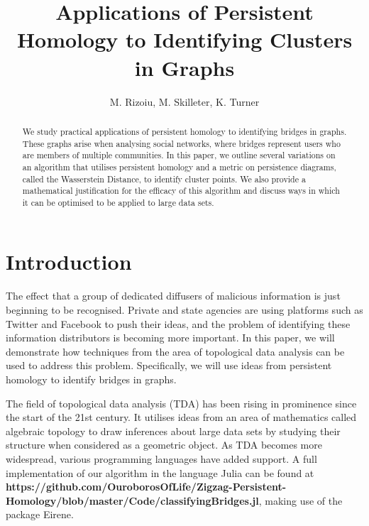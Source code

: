 \documentclass[12pt,a4paper]{amsart}
\numberwithin{equation}{section}
\theoremstyle{plain}
\theoremstyle{definition}
\begin{document}
\title{Applications of Persistent Homology to Identifying Clusters in Graphs }


\author[]{M. Rizoiu, M. Skilleter, K. Turner}

\address{Australian National University \\ Mathematical Sciences Institute} 


\begin{abstract} We study practical applications of persistent homology to identifying bridges in graphs. These graphs arise when analysing social networks, where bridges represent users who are members of multiple communities. In this paper, we outline several variations on an algorithm that utilises persistent homology and a metric on persistence diagrams, called the Wasserstein Distance, to identify cluster points. We also provide a mathematical justification for the efficacy of this algorithm and discuss ways in which it can be optimised to be applied to large data sets.
\end{abstract}

\maketitle

\section{Introduction} The effect that a group of dedicated diffusers of malicious information is just beginning to be recognised. Private and state agencies are using platforms such as Twitter and Facebook to push their ideas, and the problem of identifying these information distributors is becoming more important. In this paper, we will demonstrate how techniques from the area of topological data analysis can be used to address this problem. Specifically, we will use ideas from persistent homology to identify bridges in graphs.

The field of topological data analysis (TDA) has been rising in prominence since the start of the 21st century. It utilises ideas from an area of mathematics called algebraic topology to draw inferences about large data sets by studying their structure when considered as a geometric object. As TDA becomes more widespread, various programming languages have added support. A full implementation of our algorithm in the language Julia can be found at \small{\textbf{https://github.com/OuroborosOfLife/Zigzag-Persistent-Homology/blob/master/Code/classifyingBridges.jl}}, making use of the package Eirene.
\end{document}
